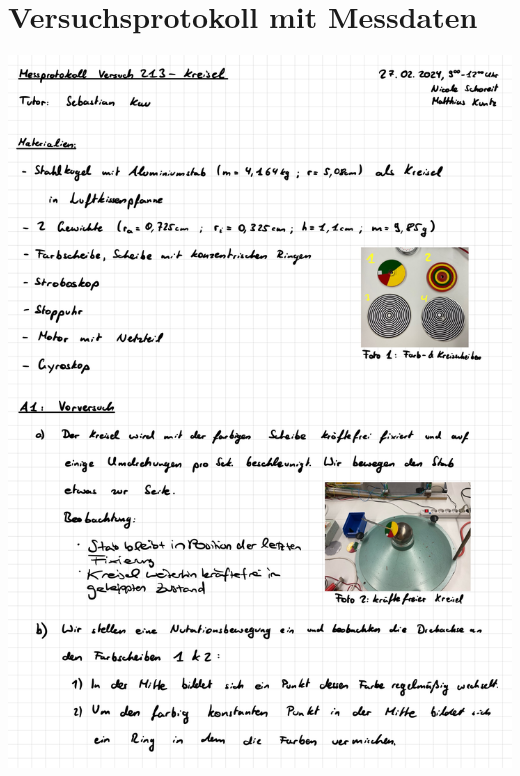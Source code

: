 \documentclass{article}
\begin{document}
\newpage

\section{Versuchsprotokoll mit Messdaten}

\includegraphics[width=\textwidth]{graphics/mess1.jpg}
\newpage
\end{document}

